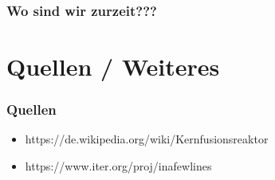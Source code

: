 \documentclass[aspectratio=169]{beamer}
\begin{document}
  \begin{frame}
    \frametitle{Wo sind wir zurzeit???}
  \end{frame}

  \section{Quellen / Weiteres}

    \begin{frame}
      \frametitle{Quellen}
      \begin{itemize}
        \item https://de.wikipedia.org/wiki/Kernfusionsreaktor
        \item https://www.iter.org/proj/inafewlines
      \end{itemize}
    \end{frame}
\end{document}
